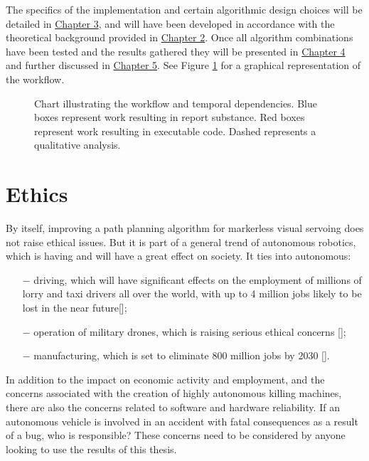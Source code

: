 The specifics of the implementation and certain algorithmic design choices will be detailed in \hyperref[ch3:implement]{Chapter 3}, and will have been developed in accordance with the theoretical background provided in \hyperref[ch2:theoframe]{Chapter 2}. Once all algorithm combinations have been tested and the results gathered they will be presented in \hyperref[ch4:resu]{Chapter 4} and further discussed in \hyperref[ch5:discussion]{Chapter 5}. See Figure \ref{fig:workflow} for a graphical representation of the workflow.


\begin{figure}[h]
	
	\caption{Chart illustrating the workflow and temporal dependencies. Blue boxes represent work resulting in report substance. Red boxes represent work resulting in executable code. Dashed represents a qualitative analysis.}
	\label{fig:workflow}
\end{figure}



\section{Ethics} 
By itself, improving a path planning algorithm for markerless visual servoing does not raise ethical issues. But it is part of a general trend of autonomous robotics, which is having and will have a great effect on society. It ties into autonomous: 
\begin{enumerate}
	\item[$-$] driving, which will have significant effects on the employment of millions of lorry and taxi drivers all over the world, with up to 4 million jobs likely to be lost in the near future[\citeauthor{Austin2017}];
	\item[$-$] operation of military drones, which is raising serious ethical concerns [\citeauthor{978-1-4799-4992-2/14}]; 
	\item[$-$]  manufacturing, which is set to eliminate 800 million jobs by 2030 [\citeauthor{Manyika2017}]. 
\end{enumerate}

In addition to the impact on economic activity and employment, and the concerns associated with the creation of highly autonomous killing machines, there are also the concerns related to software and hardware reliability. If an autonomous vehicle is involved in an accident with fatal consequences as a result of a bug, who is responsible? These concerns need to be considered by anyone looking to use the results of this thesis.

